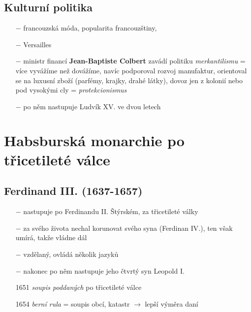 \documentclass{article}
\begin{document}
\subsection*{Kulturní politika}
\begin{itemize}
    \vspace{-0.5em}
    \setlength\itemsep{0.15em}
    \item[$-$] francouzská móda, popularita francouzštiny, 
    \item[$-$] Versailles
    \item[$-$] ministr financí \textbf{Jean-Baptiste Colbert} zavádí politiku \textit{merkantilismu} = více vyvážíme než dovážíme, navíc podporoval rozvoj manufaktur, orientoval se na luxusní zboží (parfémy, krajky, drahé látky), dovoz jen z kolonií nebo pod vysokými cly = \textit{protekcionismus}
\end{itemize}

\begin{itemize}
    \vspace{-0.5em}
    \setlength\itemsep{0.15em}
    \item[$-$] po něm nastupuje Ludvík XV. ve dvou letech
\end{itemize}

\section*{Habsburská monarchie po třicetileté válce}

\subsection*{Ferdinand III. (1637-1657)}

\begin{itemize}
    \vspace{-0.5em}
    \setlength\itemsep{0.15em}
    \item[$-$] nastupuje po Ferdinandu II. Štýrském, za třicetileté války
    \item[$-$] za svého života nechal korunovat svého syna (Ferdinan IV.), ten však umírá, takže vládne dál
    \item[$-$] vzdělaný, ovládá několik jazyků
    \item[$-$] nakonec po něm nastupuje jeho čtvrtý syn Leopold I.
    \item[1651] \textit{soupis poddaných} po třicetileté válce
    \item[1654] \textit{berní rula} = soupis obcí, katastr $\rightarrow$ lepší výměra daní
\end{itemize}
\end{document}
